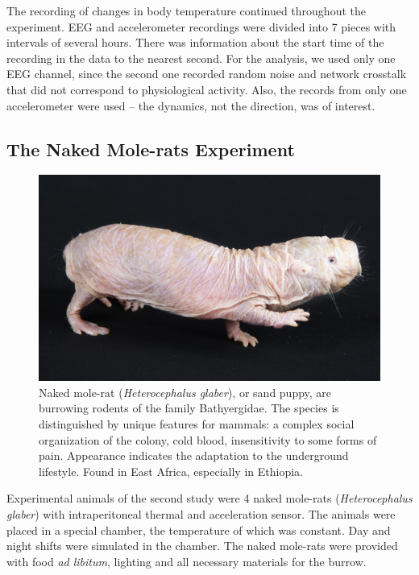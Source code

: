 \documentclass[14pt,a4paper]{scrartcl}
\begin{document}
The recording of changes in body temperature continued throughout the experiment. EEG and accelerometer recordings were divided into 7 pieces with intervals of several hours. There was information about the start time of the recording in the data to the nearest second. For the analysis, we used only one EEG channel, since the second one recorded random noise and network crosstalk that did not correspond to physiological activity. Also, the records from only one accelerometer were used – the dynamics, not the direction, was of interest.






\subsection{The Naked Mole-rats Experiment}
\label{sec:Methods:The Naked Mole-rats Experiment}

\begin{figure}[H]
\centering
\includegraphics[width=0.7\linewidth]{nakedmolerat.jpg}
\caption{Naked mole-rat (\textit{Heterocephalus glaber}), or sand puppy, are burrowing rodents of the family Bathyergidae. The species is distinguished by unique features for mammals: a complex social organization of the colony, cold blood, insensitivity to some forms of pain. Appearance indicates the adaptation to the underground lifestyle. Found in East Africa, especially in Ethiopia.}\label{fig:nakedmolerat}
\end{figure}

Experimental animals of the second study were 4 naked mole-rats (\textit{Heterocephalus glaber}) with intraperitoneal thermal and acceleration sensor. The animals were placed in a special chamber, the temperature of which was constant. Day and night shifts were simulated in the chamber. The naked mole-rats were provided with food \textit{ad libitum}, lighting and all necessary materials for the burrow. 
\end{document}

